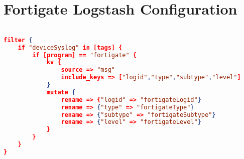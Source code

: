 
%
%

\section*{Fortigate Logstash Configuration}
%
\label{appendix:fortigatelogstashconfiguration}

\begin{lstlisting}[language=json,firstnumber=1]

filter {
    if "deviceSyslog" in [tags] {
        if [program] == "fortigate" { 
            kv {
                source => "msg"
                include_keys => ["logid","type","subtype","level"]
            }
            mutate {
                rename => {"logid" => "fortigateLogid"}
                rename => {"type" => "fortigateType"}
                rename => {"subtype" => "fortigateSubtype"}
                rename => {"level" => "fortigateLevel"}
            }
        }
    }    
}

\end{lstlisting}

\pagebreak


